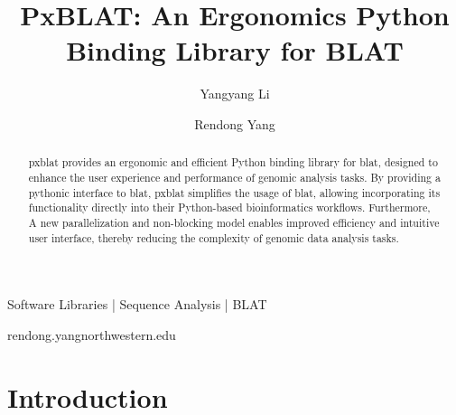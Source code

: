
\title{PxBLAT: An Ergonomics Python Binding Library for BLAT}

\author[1]{Yangyang Li}
\author[1,\Letter]{Rendong Yang }
\date{}

\maketitle

\begin{abstract}
	\gls{pxblat} provides an ergonomic and efficient Python binding library for \gls{blat}, designed to enhance the user experience and performance of genomic analysis tasks.
	By providing a pythonic interface to \gls{blat}, \gls{pxblat} simplifies the usage of \gls{blat}, allowing incorporating its functionality directly into their Python-based bioinformatics workflows.
	Furthermore, A new parallelization and non-blocking model enables improved efficiency and intuitive user interface, thereby reducing the complexity of genomic data analysis tasks.
\end{abstract}


\begin{keywords}
	Software Libraries |  Sequence Analysis | BLAT
\end{keywords}

\begin{corrauthor}
	rendong.yang\at northwestern.edu
\end{corrauthor}

\section*{Introduction}\label{sec:introduction}


